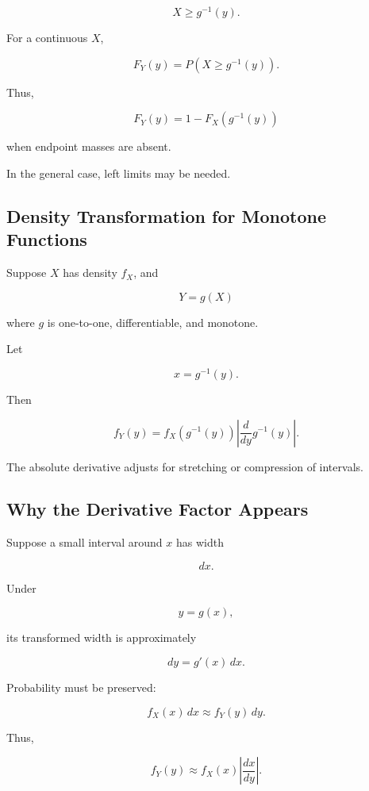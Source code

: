 \[
X\geq g^{-1}(y).
\]

For a continuous \(X\),

\[
F_Y(y)
=
P(X\geq g^{-1}(y)).
\]

Thus,

\[
\boxed{
F_Y(y)
=
1-
F_X(g^{-1}(y))
}
\]

when endpoint masses are absent.

In the general case, left limits may be needed.

\subsection{Density Transformation for Monotone Functions}
\label{subsec:density-monotone-transform}

Suppose \(X\) has density \(f_X\), and

\[
Y=g(X)
\]

where \(g\) is one-to-one, differentiable, and monotone.

Let

\[
x=g^{-1}(y).
\]

Then

\[
\boxed{
f_Y(y)
=
f_X(g^{-1}(y))
\left|
\frac{d}{dy}
g^{-1}(y)
\right|.
}
\]

The absolute derivative adjusts for stretching or compression of
intervals.

\subsection{Why the Derivative Factor Appears}
\label{subsec:why-derivative-factor}

Suppose a small interval around \(x\) has width

\[
dx.
\]

Under

\[
y=g(x),
\]

its transformed width is approximately

\[
dy
=
g'(x)\,dx.
\]

Probability must be preserved:

\[
f_X(x)\,dx
\approx
f_Y(y)\,dy.
\]

Thus,

\[
f_Y(y)
\approx
f_X(x)
\left|
\frac{dx}{dy}
\right|.
\]

